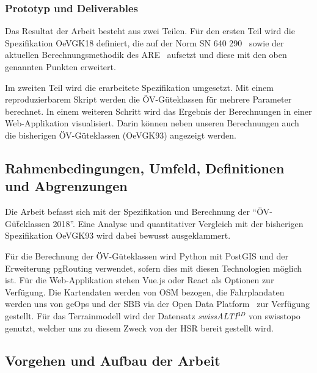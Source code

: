 \subsubsection{Prototyp und Deliverables}
\label{Ziele und Unterziele:Prototyp und Deliverables}

Das Resultat der Arbeit besteht aus zwei Teilen.
Für den ersten Teil wird die Spezifikation \gls{OeVGK18} definiert, die auf der Norm SN 640 290~\cite{sn640290} sowie der aktuellen Berechnungsmethodik des \acs{ARE}~\cite{berechnung_are} aufsetzt und diese mit den oben genannten Punkten erweitert.

Im zweiten Teil wird die erarbeitete Spezifikation umgesetzt.
Mit einem reproduzierbarem Skript werden die \acs{ÖV}-Güteklassen für mehrere Parameter berechnet.
In einem weiteren Schritt wird das Ergebnis der Berechnungen in einer Web-Applikation visualisiert.
Darin können neben unseren Berechnungen auch die bisherigen \acs{ÖV}-Güteklassen (\gls{OeVGK93}) angezeigt werden.

\subsection{Rahmenbedingungen, Umfeld, Definitionen und Abgrenzungen}
\label{Einführung:Rahmenbedingungen, Umfeld, Definitionen, Abgrenzungen}

Die Arbeit befasst sich mit der Spezifikation und Berechnung der "`ÖV-Güẗeklassen 2018"'.
Eine Analyse und quantitativer Vergleich mit der bisherigen Spezifikation \gls{OeVGK93} wird dabei bewusst ausgeklammert.

Für die Berechnung der ÖV-Güteklassen wird Python mit PostGIS und der Erweiterung pgRouting verwendet, sofern dies mit diesen Technologien möglich ist.
Für die Web-Applikation stehen Vue.js oder React als Optionen zur Verfügung. Die Kartendaten werden von \ac{OSM} bezogen, die Fahrplandaten werden uns von geOps und der SBB via der Open Data Platform~\cite{sbb_open_transport_data} zur Verfügung gestellt.
Für das \gls{Terrainmodell} wird der Datensatz \emph{swissALTI$^{3D}$} von swisstopo~\cite{swissalti3d_swisstopo} genutzt, welcher uns zu diesem Zweck von der HSR bereit gestellt wird.

\subsection{Vorgehen und Aufbau der Arbeit}
\label{Einführung:Vorgehen und Aufbau der Arbeit}

